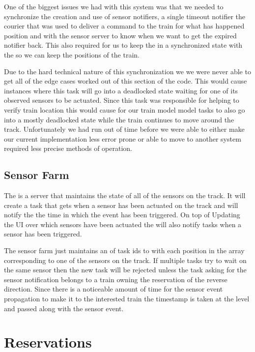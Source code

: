 \documentclass[pdftex,10pt,a4paper]{article}
\begin{document}
One of the biggest issues we had with this system was that we needed to
synchronize the creation and use of sensor notifiers, a single timeout notifier
the courier that was used to deliver a command to the train for what has
happened position and with the sensor server to know when we want to get the
expired notifier back. This also required for us to keep the
 in a synchronized state with the  so we
can keep the positions of the train.

Due to the hard technical nature of this synchronization we we were never able
to get all of the edge cases worked out of this section of the code. This would
cause instances where this task will go into a deadlocked state waiting for one
of its observed sensors to be actuated. Since this task was responsible for
helping to verify train location this would cause for our train model model
tasks to also go into a mostly deadlocked state while the train continues to
move around the track. Unfortunately we had run out of time before we were able
to either make our current implementation less error prone or able to move to
another system required less precise methods of operation.

\subsection*{Sensor Farm}

The  is a server that maintains the state of all of the
sensors on the track. It will create a task  that gets when
a sensor has been actuated on the track and will notify the 
the time in which the event has been triggered. On top of Updating the UI over
which sensors have been actuated the  will also notify tasks
when a sensor has been triggered.

The sensor farm just maintains an of task ids to with each position in the
array corresponding to one of the sensors on the track. If multiple tasks try
to wait on the same sensor then the new task will be rejected unless the task
asking for the sensor notification belongs to a train owning the reservation of
the reverse direction. Since there is a noticeable amount of time for the
sensor event propagation to make it to the interested train the timestamp is
taken at the  level and passed along with the sensor event.

\section*{Reservations}
\end{document}
